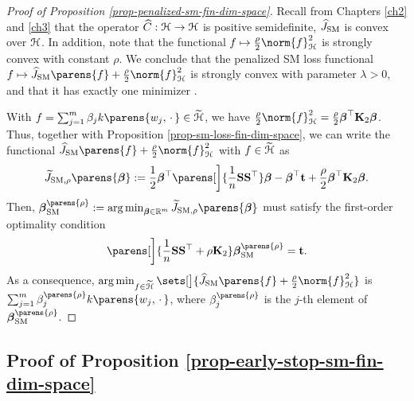 \begin{proof}[Proof of Proposition \ref{prop-penalized-sm-fin-dim-space}]
	Recall from Chapters \ref{ch2} and \ref{ch3} that the operator $\widehat{C}: \mathcal{H} \to \mathcal{H}$ is positive semidefinite, $\widehat{J}_{\mathrm{SM}}$ is convex over $\mathcal{H}$. In addition, note that the functional $f \mapsto \frac{\rho}{2} \norm{f}_{\calH}^2$ is strongly convex with constant $\rho$. We conclude that the penalized SM loss functional $f \mapsto \widehat{J}_{\SM} \parens{f} + \frac{\rho}{2} \norm{f}_{\calH}^2$ is strongly convex with parameter $\lambda > 0$, and that it has exactly one minimizer \parencite[Corollary 11.17 in][]{Bauschke2017-he}. 
	
	With $f = \sum_{j=1}^m \beta_j k \parens{w_j, \,\cdot\,} \in \widetilde{\calH}$, we have $\frac{\rho}{2} \norm{f}_{\calH}^2 = \frac{\rho}{2} \bbeta^\top \bK_2 \bbeta$. Thus, together with Proposition \ref{prop-sm-loss-fin-dim-space}, we can write the functional $\widehat{J}_{\SM} \parens{f} + \frac{\rho}{2} \norm{f}_{\calH}^2$ with $f \in \widetilde{\mathcal{H}}$ as 
	\begin{align*}
		\widetilde{J}_{\SM, \rho} \parens{\bbeta} := \frac{1}{2} \bbeta^\top \parens[\bigg]{\frac{1}{n} \bS \bS^\top} \bbeta - \bbeta^\top \bt + \frac{\rho}{2} \bbeta^\top \bK_2 \bbeta. 
	\end{align*}
	Then, $\bbeta_{\SM}^{\parens{\rho}} := \argmin_{\bbeta \in \Real^m} \widetilde{J}_{\SM, \rho} \parens{\bbeta}$ must satisfy the first-order optimality condition 
	\begin{align*}
		\parens[\bigg]{\frac{1}{n} \bS \bS^\top + \rho \bK_2} \bbeta_{\SM}^{\parens{\rho}} = \bt. 
	\end{align*}
	As a consequence, $\argmin_{f \in \widetilde{\calH}} \sets[\big]{\widehat{J}_{\SM} \parens{f} + \frac{\rho}{2} \norm{f}_{\calH}^2}$ is $\sum_{j=1}^m \beta_j^{\parens{\rho}} k \parens{w_j, \,\cdot\,}$, where $\beta_j^{\parens{\rho}}$ is the $j$-th element of $\bbeta_{\SM}^{\parens{\rho}}$. 
\end{proof}


\subsection{Proof of Proposition \ref{prop-early-stop-sm-fin-dim-space}}\label{proof-prop-early-stop-sm-fin-dim-space}

